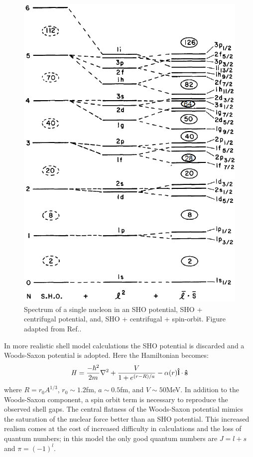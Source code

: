 \begin{figure}
\centerline{\includegraphics[height=0.45\textheight]{./img/c2/shell_model.png}}
	\caption{Spectrum of a single nucleon in an SHO potential, SHO + centrifugal potential, and, SHO + centrifugal + spin-orbit. Figure adapted from Ref.\cite{casten}.\label{fig:chp2-shell-model}}
\end{figure}


In more realistic shell model calculations the SHO potential is discarded and a Woods-Saxon potential is adopted. Here the Hamiltonian becomes:
\begin{equation}
\label{eqn:chp2-sm-ws-hamil}
\mathbf{\mathit{H}} = \frac{-\hbar^2}{2m}\nabla^2 + \frac{V}{1+e^{(r-R)/a}} - \alpha(r)\boldsymbol{\hat{\textbf{l}}}\cdot\boldsymbol{\hat{\textbf{s}}}
\end{equation}
where $R=r_0A^{1/3}$, $r_0\sim1.2$fm, $a\sim0.5$fm, and $V\sim50$MeV. In addition to the Woods-Saxon component, a spin orbit term is necessary to reproduce the observed shell gaps. The central flatness of the Woods-Saxon potential mimics the saturation of the nuclear force better than an SHO potential. This increased realism comes at the cost of increased difficulty in calculations and the loss of quantum numbers; in this model the only good quantum numbers are $J=\mathit{l}+\mathit{s}$ and $\pi = (-1)^\mathit{l}$.

